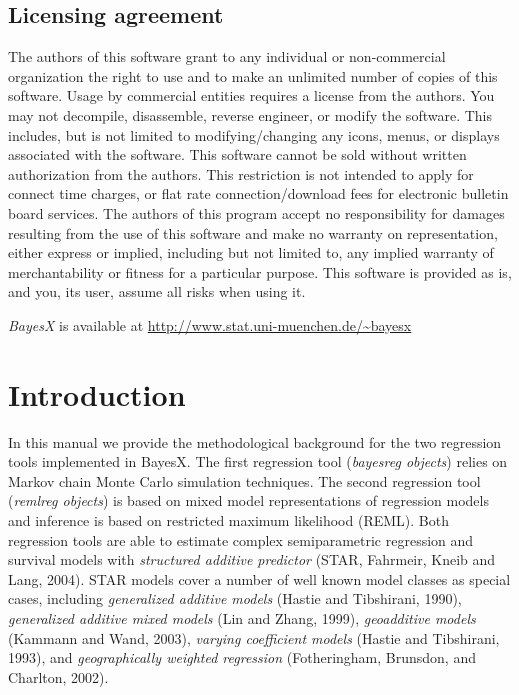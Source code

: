 \documentclass[11pt,a4paper,twoside]{bayesxarticle}
\begin{document}
\subsection*{Licensing agreement} The authors of this software grant
to any individual or non-commercial organization the right to use
and to make an unlimited number of copies of this software. Usage by
commercial entities requires a license from the authors. You may not
decompile, disassemble, reverse engineer, or modify the software.
This includes, but is not limited to modifying/changing any icons,
menus, or displays associated with the software. This software
cannot be sold without written authorization from the authors. This
restriction is not intended to apply for connect time charges, or
flat rate connection/download fees for electronic bulletin board
services. The authors of this program accept no responsibility for
damages resulting from the use of this software and make no warranty
on representation, either express or implied, including but not
limited to, any implied warranty of merchantability or fitness for a
particular purpose. This software is provided as is, and you, its
user, assume all risks when using it.

\vspace{0.5cm}

{\em BayesX} is available at {
\href{http://www.stat.uni-muenchen.de/~bayesx}{http://www.stat.uni-muenchen.de/\~{}bayesx}}

\newpage

\section{Introduction}

In this manual we provide the methodological background for the two
regression tools implemented in BayesX. The first regression tool
({\em bayesreg objects}) relies on Markov chain Monte Carlo
simulation techniques. The second regression tool ({\em remlreg
objects}) is based on mixed model representations of regression
models and inference is based on restricted maximum likelihood
(REML). Both regression tools are able to estimate complex
semiparametric regression and survival models with {\em structured
additive predictor} (STAR, Fahrmeir, Kneib and Lang, 2004). STAR
models cover a number of well known model classes as special cases,
including {\em generalized additive models} (Hastie and Tibshirani,
1990), {\em generalized additive mixed models} (Lin and Zhang,
1999), {\em geoadditive models} (Kammann and Wand, 2003), {\em
varying coefficient models} (Hastie and Tibshirani, 1993), and {\em
geographically weighted regression} (Fotheringham, Brunsdon, and
Charlton, 2002).
\end{document}
